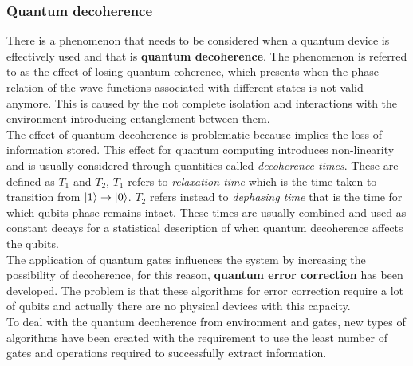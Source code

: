 \subsubsection{Quantum decoherence}
There is a phenomenon that needs to be considered when a quantum device is effectively used and that is \textbf{quantum decoherence}. The phenomenon is referred to as the effect of losing quantum coherence, which presents when the phase relation of the wave functions associated with different states is not valid anymore. This is caused by the not complete isolation and interactions with the environment introducing entanglement between them.\\
The effect of quantum decoherence is problematic because implies the loss of information stored. This effect for quantum computing introduces non-linearity and is usually considered through quantities called \textit{decoherence times}. These are defined as $T_1$ and $T_2$, $T_1$ refers to \textit{relaxation time} which is the time taken to transition from $\ket{1} \to \ket{0}$. $T_2$ refers instead to \textit{dephasing time} that is the time for which qubits phase remains intact. These times are usually combined and used as constant decays for a statistical description of when quantum decoherence affects the qubits.\\
The application of quantum gates influences the system by increasing the possibility of decoherence, for this reason, \textbf{quantum error correction} has been developed. The problem is that these algorithms for error correction require a lot of qubits and actually there are no physical devices with this capacity.\\
To deal with the quantum decoherence from environment and gates, new types of algorithms have been created with the requirement to use the least number of gates and operations required to successfully extract information.

